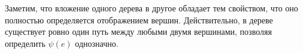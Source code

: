 \documentclass[12pt, a4paper]{article}
\theoremstyle{plain}
\theoremstyle{definition}
\theoremstyle{definition}
\newcommand{\floor}[1]{\left\lfloor{#1}\right\rfloor}
\newcommand{\ceil}[1]{\left\lceil{#1}\right\rceil}
\renewcommand{\hat}{\widehat}
\begin{document}
Заметим, что вложение одного дерева в другое обладает тем свойством, что оно полностью определяется отображением вершин. Действительно, в дереве существует ровно один путь между любыми двумя вершинами, позволяя определить $\psi(e)$ однозначно.

%
\end{document}

